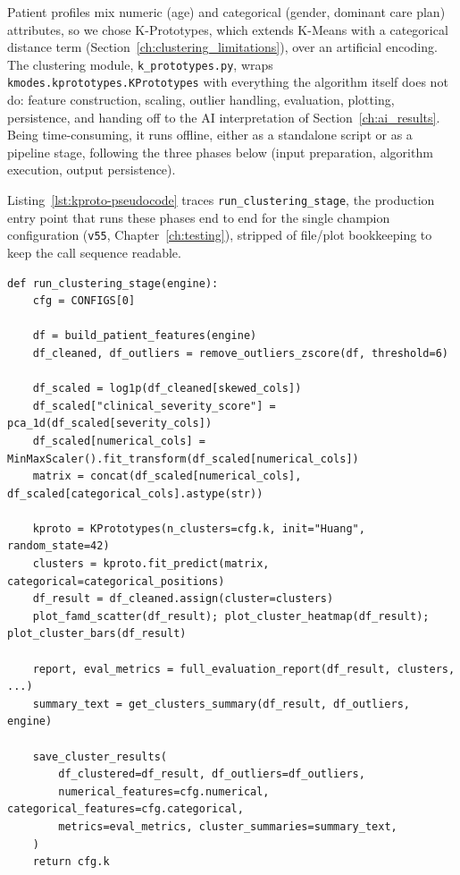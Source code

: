 Patient profiles mix numeric (age) and categorical (gender, dominant care plan) attributes, so we chose K-Prototypes, which extends K-Means with a categorical distance term (Section~\ref{ch:clustering_limitations}), over an artificial encoding. The clustering module, \texttt{k\_prototypes.py}, wraps \texttt{kmodes.kprototypes.KPrototypes} with everything the algorithm itself does not do: feature construction, scaling, outlier handling, evaluation, plotting, persistence, and handing off to the AI interpretation of Section~\ref{ch:ai_results}. Being time-consuming, it runs offline, either as a standalone script or as a pipeline stage, following the three phases below (input preparation, algorithm execution, output persistence).

Listing~\ref{lst:kproto-pseudocode} traces \texttt{run\_clustering\_stage}, the production entry point that runs these phases end to end for the single champion configuration (\texttt{v55}, Chapter~\ref{ch:testing}), stripped of file/plot bookkeeping to keep the call sequence readable.

\begin{lstlisting}[style=pythonstyle, caption={Pseudocode of the production clustering run (\texttt{run\_clustering\_stage})}, label={lst:kproto-pseudocode}]
def run_clustering_stage(engine):
    cfg = CONFIGS[0]

    df = build_patient_features(engine)
    df_cleaned, df_outliers = remove_outliers_zscore(df, threshold=6)

    df_scaled = log1p(df_cleaned[skewed_cols])
    df_scaled["clinical_severity_score"] = pca_1d(df_scaled[severity_cols])
    df_scaled[numerical_cols] = MinMaxScaler().fit_transform(df_scaled[numerical_cols])
    matrix = concat(df_scaled[numerical_cols], df_scaled[categorical_cols].astype(str))

    kproto = KPrototypes(n_clusters=cfg.k, init="Huang", random_state=42)
    clusters = kproto.fit_predict(matrix, categorical=categorical_positions)
    df_result = df_cleaned.assign(cluster=clusters)
    plot_famd_scatter(df_result); plot_cluster_heatmap(df_result); plot_cluster_bars(df_result)

    report, eval_metrics = full_evaluation_report(df_result, clusters, ...)
    summary_text = get_clusters_summary(df_result, df_outliers, engine)

    save_cluster_results(
        df_clustered=df_result, df_outliers=df_outliers,
        numerical_features=cfg.numerical, categorical_features=cfg.categorical,
        metrics=eval_metrics, cluster_summaries=summary_text,
    )
    return cfg.k
\end{lstlisting}

